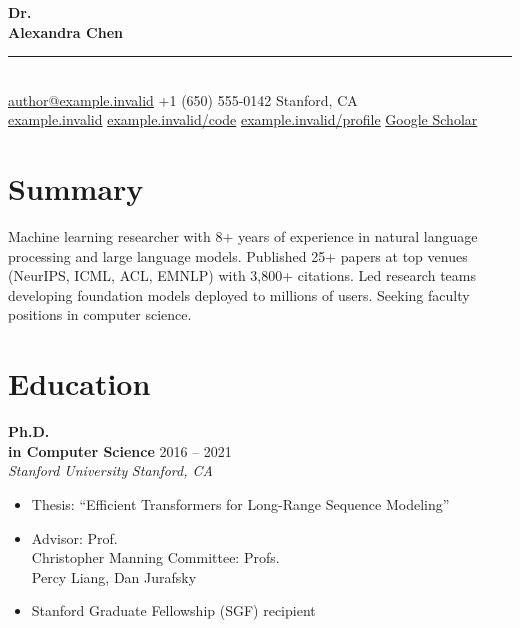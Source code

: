 \documentclass[11pt,a4paper]{article}
\newcommand{\cventry}[4]{%
  \textbf{#1} \hfill {\color{lightgray}#2}\\
  {\color{accent}\textit{#3}} \hfill {\color{lightgray}\textit{#4}}\\[2pt]
}
\begin{document}
\begin{center}
  {\fontsize{28}{34}\selectfont\bfseries\color{primary} Dr.\\ Alexandra Chen}\\[8pt]
  {\color{lightgray}\rule{8cm}{0.5pt}}\\[8pt]
  {\small
    \;\href{mailto:author@example.invalid}{author@example.invalid} \quad
    \;+1 (650) 555-0142 \quad
    \;Stanford, CA\\[4pt]
    \;\href{https://example.invalid}{example.invalid} \quad
    \;\href{https://example.invalid/code}{example.invalid/code} \quad
    \;\href{https://example.invalid/profile}{example.invalid/profile} \quad
    \;\href{https://scholar.google.com/citations?user=XXXXX}{Google Scholar}
  }
\end{center}

\vspace{4pt}

\section{Summary}

Machine learning researcher with 8+ years of experience in natural language processing and large language models. Published 25+ papers at top venues (NeurIPS, ICML, ACL, EMNLP) with 3,800+ citations. Led research teams developing foundation models deployed to millions of users. Seeking faculty positions in computer science.

\section{Education}

\cventry{Ph.D.\\ in Computer Science}{2016 -- 2021}{Stanford University}{Stanford, CA}
\begin{itemize}[leftmargin=1.5em, nosep, itemsep=2pt]
  \item Thesis: ``Efficient Transformers for Long-Range Sequence Modeling''
  \item Advisor: Prof.\\ Christopher Manning \quad Committee: Profs.\\ Percy Liang, Dan Jurafsky
  \item Stanford Graduate Fellowship (SGF) recipient
\end{itemize}
\end{document}
